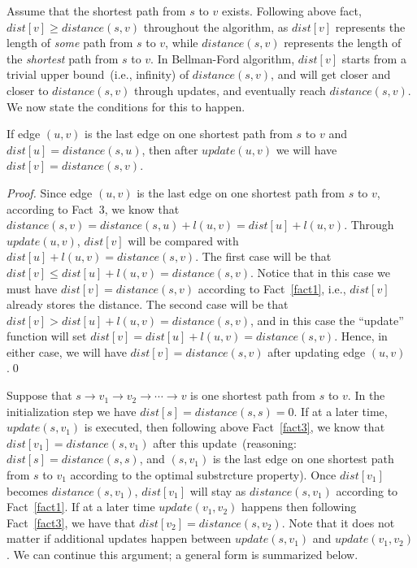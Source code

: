 Assume that the shortest path from $s$ to $v$ exists. 
Following above fact, $dist[v] \ge distance(s,v)$ throughout the algorithm, as $dist[v]$ 
represents the length of \emph{some} path from $s$ to $v$, while $distance(s,v)$ represents the
length of the \emph{shortest} path from $s$ to $v$.
In Bellman-Ford algorithm, $dist[v]$ starts from a trivial upper bound~(i.e., infinity) of $distance(s,v)$,
and will get closer and closer to $distance(s,v)$ through updates,
and eventually reach $distance(s, v)$.  We now state the conditions for this to happen.

\begin{fact}
\label{fact3}
If edge $(u,v)$ is the last edge on one shortest path from $s$ to $v$ and $dist[u] = distance(s,u)$, then after $update(u,v)$ we will have $dist[v] = distance(s,v)$.
\end{fact}
\emph{Proof.} Since edge $(u,v)$ is the last edge on one shortest path from $s$ to $v$, according to Fact~3, we know that
$distance(s,v) = distance(s,u) + l(u,v) = dist[u] + l(u,v)$. Through $update(u,v)$, $dist[v]$ will be compared with $dist[u] + l(u,v) = distance(s,v)$.
The first case will be that $dist[v] \le dist[u] + l(u,v) = distance(s,v)$. Notice that in this case we must have 
$dist[v] = distance(s,v)$ according to Fact~\ref{fact1}, i.e., $dist[v]$ already stores the distance.
The second case will be that $dist[v] > dist[u] + l(u,v) = distance(s,v)$, and in this case the ``update'' function
will set $dist[v] = dist[u] + l(u,v) = distance(s,v)$. 
Hence, in either case, we will have $dist[v] = distance(s,v)$ after updating edge $(u,v)$.\qed


Suppose that $s \to v_1 \to v_2 \to \cdots \to v$ is one shortest path from $s$ to $v$.
In the initialization step we have $dist[s] = distance(s,s) = 0$. 
If at a later time, $update(s, v_1)$ is executed, then following above Fact~\ref{fact3}, 
we know that $dist[v_1] = distance(s, v_1)$ after this update~(reasoning: $dist[s] = distance(s,s)$,
and $(s,v_1)$ is the last edge on one shortest path from $s$ to $v_1$ according to the optimal substrcture property).
Once $dist[v_1]$ becomes $distance(s,v_1)$, $dist[v_1]$ will stay as $distance(s,v_1)$ according to Fact~\ref{fact1}.
If at a later time $update(v_1, v_2)$ happens 
then following Fact~\ref{fact3}, we have that $dist[v_2] = distance(s, v_2)$.
Note that it does not matter if additional updates happen between $update(s, v_1)$ and $update(v_1, v_2)$.
We can continue this argument; a general form is summarized below.

